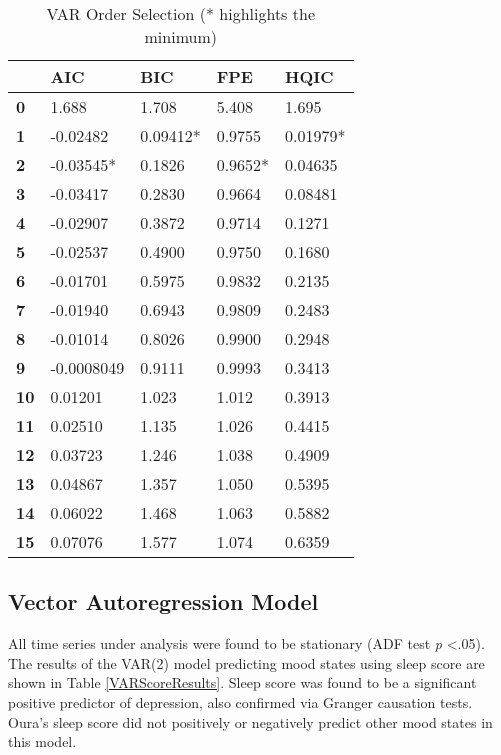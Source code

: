\documentclass[9pt]{article}
\begin{document}
\begin{table} \centering \begin{tabular}{lllll} \toprule ~ & \textbf{AIC} &
  \textbf{BIC} & \textbf{FPE} & \textbf{HQIC} \\ \midrule \textbf{0}  & 1.688
  &       1.708  &       5.408  &        1.695   \\ \textbf{1}  & -0.02482  &
  0.09412*  &      0.9755  &     0.01979*   \\ \textbf{2}  & -0.03545*  &
  0.1826  &     0.9652*  &      0.04635   \\ \textbf{3}  & -0.03417  &
  0.2830  &      0.9664  &      0.08481   \\ \textbf{4}  & -0.02907  &
  0.3872  &      0.9714  &       0.1271   \\ \textbf{5}  & -0.02537  &
  0.4900  &      0.9750  &       0.1680   \\ \textbf{6}  & -0.01701  &
  0.5975  &      0.9832  &       0.2135   \\ \textbf{7}  & -0.01940  &
  0.6943  &      0.9809  &       0.2483   \\ \textbf{8}  & -0.01014  &
  0.8026  &      0.9900  &       0.2948   \\ \textbf{9}  & -0.0008049  &
  0.9111  &      0.9993  &       0.3413   \\ \textbf{10} & 0.01201  &
  1.023  &       1.012  &       0.3913   \\ \textbf{11} & 0.02510  &
  1.135  &       1.026  &       0.4415   \\ \textbf{12} & 0.03723  &
  1.246  &       1.038  &       0.4909   \\ \textbf{13} & 0.04867  &
  1.357  &       1.050  &       0.5395   \\ \textbf{14} & 0.06022  &
1.468  &       1.063  &       0.5882   \\ \textbf{15} & 0.07076  &       1.577
&       1.074  &       0.6359   \\ \bottomrule \end{tabular} \caption{VAR Order
Selection (* highlights the minimum)} \label{VAROrderSelection} \end{table}

\subsection{Vector Autoregression Model}\label{vector-autoregression-model}

All time series under analysis were found to be stationary (ADF test \textit{p}
\textless .05). The results of the VAR(2) model predicting mood states using
sleep score are shown in Table \ref{VARScoreResults}. Sleep score was found to
be a significant positive predictor of depression, also confirmed via Granger
causation tests. Oura's sleep score did not positively or negatively predict other
mood states in this model.
\end{document}
